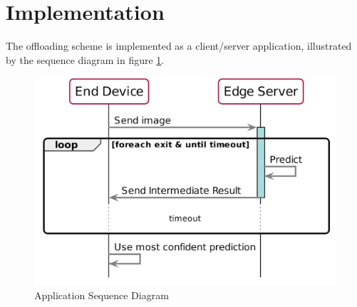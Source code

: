 %	





\section{Implementation} \label{sec:edge-implementation}

The offloading scheme is implemented as a client/server application, illustrated by the sequence diagram in figure \ref{fig:sequence-diagram}.

\begin{figure}
	\captionsetup[subfigure]{justification=centering}
	\centering
	\includegraphics[width=.7\linewidth]{figures/models/sequence_diagram}
	\caption[Application Sequence Diagram]{Application Sequence Diagram}
	\label{fig:sequence-diagram}
\end{figure}

